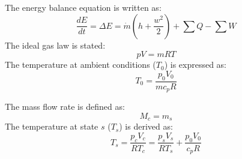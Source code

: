 The energy balance equation is written as:  
\[
\frac{dE}{dt} = \Delta E = \dot{m} \left( h + \frac{w^2}{2} \right) + \sum Q - \sum W
\]  
The ideal gas law is stated:  
\[
pV = mRT
\]  
The temperature at ambient conditions (\( T_0 \)) is expressed as:  
\[
T_0 = \frac{p_0 V_0}{m c_p R}
\]  

The mass flow rate is defined as:  
\[
M_c = m_s
\]  
The temperature at state \( s \) (\( T_s \)) is derived as:  
\[
T_s = \frac{p_c V_c}{R T_c} = \frac{p_s V_s}{R T_s} + \frac{p_0 V_0}{c_p R}
\]